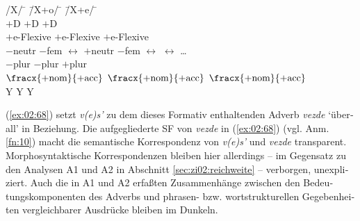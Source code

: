 \documentclass[output=paper, colorlinks, citecolor=brown, booklanguage=german]{langscibook}
\begin{document}
\begin{otherlanguage}{german}
\newpage
\ea\label{ex:02:67}
\begin{tabbing}
    /X/  \hspace{2cm}                                  \= \hspace{1cm}                  \= /X+o/ \hspace{2cm}                                 \= \hspace{1cm}                   \= /X+e/ \hspace{1cm}                                 \= \hspace{1cm}                   \=       \\
$+$D                                   \>                   \> $+$D                                   \>                   \> $+$D                                   \>                   \>       \\
$+$e-Flexive                           \>                   \> $+$e-Flexive                           \>                   \> $+$e-Flexive                           \>                   \>       \\
$-$neutr $-$fem                        \> $\leftrightarrow$ \> $+$neutr $-$fem                        \> $\leftrightarrow$ \>                                        \> $\leftrightarrow$ \> \dots \\
$-$plur                                \>                   \> $-$plur                                \>                   \> $+$plur                                \>                   \>       \\
$\fracx{+\textrm{nom}}{+\textrm{acc}}$ \>                   \> $\fracx{+\textrm{nom}}{+\textrm{acc}}$ \>                   \> $\fracx{+\textrm{nom}}{+\textrm{acc}}$ \>                   \>       \\
Y                                      \>                   \> Y                                      \>                   \> Y                                      \>                   \> \\
\end{tabbing}
\z

\noindent (\ref{ex:02:68}) setzt \textit{v(e)s'} zu dem dieses Formativ enthaltenden Adverb \textit{vezde} `überall' in Beziehung. Die aufgegliederte SF von \textit{vezde} in (\ref{ex:02:68}) (vgl. Anm. \ref{fn:10}) macht die semantische Korrespondenz von \textit{v(e)s'} und \textit{vezde} transparent. Morphosyntaktische Korrespondenzen bleiben hier allerdings -- im Gegensatz zu den Analysen A1 und A2 in Abschnitt \ref{sec:zi02:reichweite} -- verborgen, unexpliziert. Auch die in A1 und A2 erfaßten Zusammenhänge zwischen den Bedeutungskomponenten des Adverbs und phrasen- bzw. wortstrukturellen Gegebenheiten vergleichbarer Ausdrücke bleiben im Dunkeln.


\end{otherlanguage}
\end{document}
